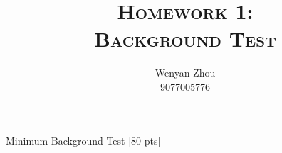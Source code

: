 \documentclass[a4paper]{article}
\title{\textsc{Homework 1: \\ Background Test}} %
\author{
Wenyan Zhou \\
9077005776\\
}
\date{}
\theoremstyle{definition}
\begin{document}
\maketitle 


\begin{center}
\Huge
Minimum Background Test [80 pts]
\end{center}
\end{document}
